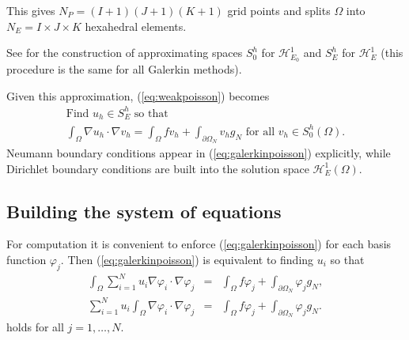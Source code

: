 \documentclass{article}
\begin{document}
This gives $N_P = (I + 1) (J + 1) (K + 1)$ grid points and splits $\Omega$
into $N_E = I \times J \times K$ hexahedral elements.

See \cite[section 1.3]{Elmanetal2005} for the construction of approximating
spaces $S_0^h$ for $\mathcal{H}^1_{E_0}$ and $S_E^h$ for $\mathcal{H}_E^1$
(this procedure is the same for all Galerkin methods).

Given this approximation, (\ref{eq:weakpoisson}) becomes
\begin{equation}
  \begin{array}{c}
    \text{Find } u_h \in S_E^h  \text{ so that}\\
    \displaystyle
    \int_{\Omega} \nabla u_h \cdot \nabla v_h = \int_{\Omega} f v_h +
    \int_{\partial \Omega_N} v_h g_N  \text{ for all } v_h \in S_0^h (\Omega)
    . \label{eq:galerkinpoisson}
  \end{array}
\end{equation}
Neumann boundary conditions appear in (\ref{eq:galerkinpoisson}) explicitly,
while Dirichlet boundary conditions are built into the solution space
$\mathcal{H}_E^1 (\Omega)$.

\subsection{Building the system of equations}

For computation it is convenient to enforce (\ref{eq:galerkinpoisson}) for
each basis function $\varphi_j$. Then (\ref{eq:galerkinpoisson}) is equivalent
to finding $u_i$ so that
\begin{eqnarray*}
  \int_{\Omega} \sum_{i = 1}^N u_i \nabla \varphi_i \cdot \nabla \varphi_j & =
  & \int_{\Omega} f \varphi_j + \int_{\partial \Omega_N} \varphi_j g_N,\\
  \sum_{i = 1}^N u_i \int_{\Omega} \nabla \varphi_i \cdot \nabla \varphi_j & =
  & \int_{\Omega} f \varphi_j + \int_{\partial \Omega_N} \varphi_j g_N .
\end{eqnarray*}
holds for all $j = 1, \ldots, N$.
\end{document}
